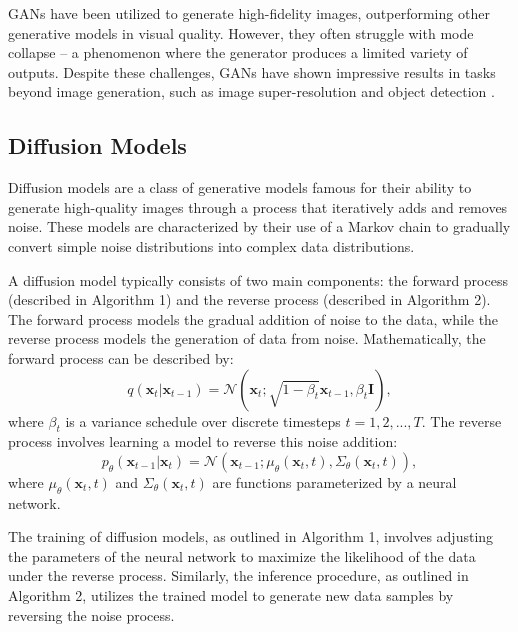 \documentclass[11pt,a4paper,oneside]{report}
\begin{document}
GANs have been utilized to generate high-fidelity images, outperforming other generative models in visual quality. However, they often struggle with mode collapse -- a phenomenon where the generator produces a limited variety of outputs. Despite these challenges, GANs have shown impressive results in tasks beyond image generation, such as image super-resolution \cite{denton2015deep}and object detection \cite{goodfellow2014generative}.

\subsection{Diffusion Models}

Diffusion models \cite{sohl2015deep, ho2020denoising} are a class of generative models famous for their ability to generate high-quality images through a process that iteratively adds and removes noise. These models are characterized by their use of a Markov chain to gradually convert simple noise distributions into complex data distributions.

A diffusion model typically consists of two main components: the forward process (described in Algorithm 1) and the reverse process (described in Algorithm 2). The forward process models the gradual addition of noise to the data, while the reverse process models the generation of data from noise. Mathematically, the forward process can be described by:
\begin{equation}
q(\mathbf{x}_t | \mathbf{x}_{t-1}) = \mathcal{N}(\mathbf{x}_t; \sqrt{1-\beta_t} \mathbf{x}_{t-1}, \beta_t \mathbf{I}),
\end{equation}
where $\beta_t$ is a variance schedule over discrete timesteps $t = 1, 2, ..., T$. The reverse process involves learning a model to reverse this noise addition:
\begin{equation}
p_{\theta}(\mathbf{x}_{t-1} | \mathbf{x}_t) = \mathcal{N}(\mathbf{x}_{t-1}; \mu_{\theta}(\mathbf{x}_t, t), \Sigma_{\theta}(\mathbf{x}_t, t)),
\end{equation}
where $\mu_{\theta}(\mathbf{x}_t, t)$ and $\Sigma_{\theta}(\mathbf{x}_t, t)$ are functions parameterized by a neural network.

The training of diffusion models, as outlined in Algorithm 1, involves adjusting the parameters of the neural network to maximize the likelihood of the data under the reverse process. Similarly, the inference procedure, as outlined in Algorithm 2, utilizes the trained model to generate new data samples by reversing the noise process.
\end{document}
